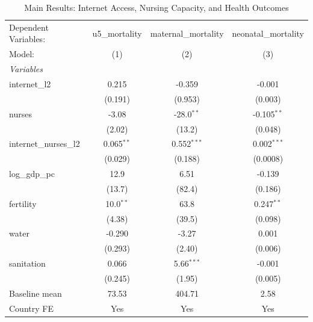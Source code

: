 \begin{table}[htbp]
   \caption{\label{tab:main_interaction} Main Results: Internet Access, Nursing Capacity, and Health Outcomes}
   \centering
   \begin{tabular}{lccc}
      \tabularnewline \midrule \midrule
      Dependent Variables:   & u5\_mortality  & maternal\_mortality  & neonatal\_mortality\\   
      Model:                 & (1)            & (2)                  & (3)\\  
      \midrule
      \emph{Variables}\\
      internet\_l2           & 0.215          & -0.359               & -0.001\\   
                             & (0.191)        & (0.953)              & (0.003)\\   
      nurses                 & -3.08          & -28.0$^{**}$         & -0.105$^{**}$\\   
                             & (2.02)         & (13.2)               & (0.048)\\   
      internet\_nurses\_l2   & 0.065$^{**}$   & 0.552$^{***}$        & 0.002$^{***}$\\   
                             & (0.029)        & (0.188)              & (0.0008)\\   
      log\_gdp\_pc           & 12.9           & 6.51                 & -0.139\\   
                             & (13.7)         & (82.4)               & (0.186)\\   
      fertility              & 10.0$^{**}$    & 63.8                 & 0.247$^{**}$\\   
                             & (4.38)         & (39.5)               & (0.098)\\   
      water                  & -0.290         & -3.27                & 0.001\\   
                             & (0.293)        & (2.40)               & (0.006)\\   
      sanitation             & 0.066          & 5.66$^{***}$         & -0.001\\   
                             & (0.245)        & (1.95)               & (0.005)\\   
      Baseline mean          & 73.53          & 404.71               & 2.58\\  
      Country FE             & Yes            & Yes                  & Yes\\  

\end{tabular}
\end{table}
